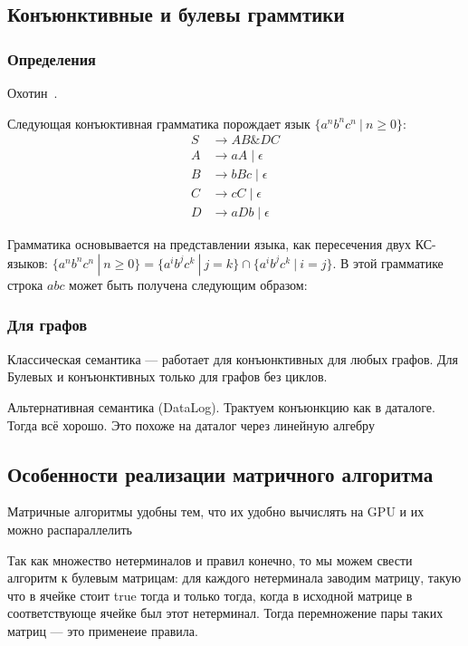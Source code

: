\subsection{Конъюнктивные и булевы граммтики}

\subsubsection{Определения}

Охотин~\cite{!!!}.
\begin{example}
	Следующая конъюктивная грамматика порождает язык $ \{a^nb^nc^n~|~n \geq 0\}$:
	\begin{align*}
	S   &\to A B \& D C \\ 
	A  &\to a A \mid \epsilon \\ 
	B &\to b B c \mid \epsilon \\
	C   &\to c C \mid \epsilon \\ 
	D   &\to aDb \mid \epsilon
	\end{align*}
	
	Грамматика основывается на представлении языка, как пересечения двух КС-языков: $\{a^nb^nc^n~|~n \geq 0\}=\{a^ib^jc^k~|~j = k\} \cap \{a^ib^jc^k~|~i = j\}$. В этой грамматике строка $abc$ может быть получена следующим образом:
\end{example}
\subsubsection{Для графов}


Классическая семантика --- работает для конъюнктивных для любых графов.
Для Булевых и конъюнктивных только для графов без циклов.

Альтернативная семантика (DataLog).
Трактуем конъюнкцию как в даталоге. Тогда всё хорошо.
Это похоже на даталог через линейную алгебру~\cite{!!!}
\subsection{Особенности реализации матричного алгоритма}

Матричные алгоритмы удобны тем, что их удобно вычислять на GPU и их можно распараллелить~\cite{Mishin:2019:ECP:3327964.3328503}

Так как множество нетерминалов и правил конечно, то мы можем свести алгоритм к булевым матрицам: для каждого нетерминала заводим матрицу, такую что в ячейке стоит true тогда и только тогда, когда в исходной матрице в соответствующе ячейке был этот нетерминал.
Тогда перемножение пары таких матриц --- это применеие правила.


